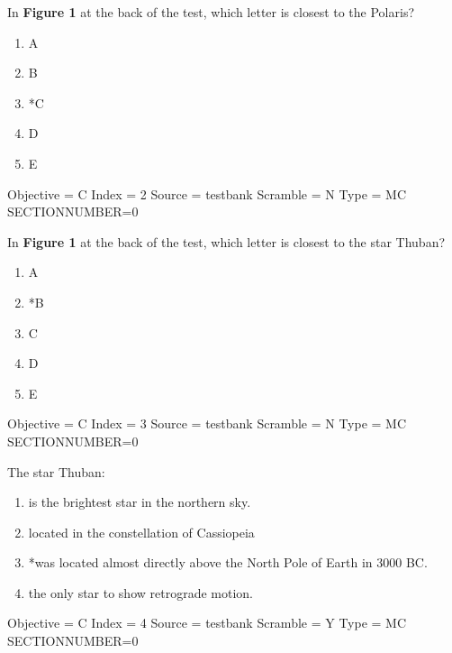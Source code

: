 \documentclass[11pt]{article}
\begin{document}
\begin{enumerate}
\begin{minipage}{\textwidth}
\begin{minipage}{\textwidth}
\item In {\bf Figure 1} at the back of the test, which letter is closest to the Polaris?
\begin{multicols}{3}
\begin{enumerate} 
\setlength{\itemsep}{1pt} 
\setlength{\parskip}{0pt} 
\setlength{\parsep}{0pt}
\setlength{\multicolsep}{1pt} 
\item A
\item B
\item *C
\item D
\item E
\end{enumerate} 
\vfill 
\end{multicols}

Objective = C
Index = 2
Source = testbank
Scramble = N
Type = MC
SECTIONNUMBER=0
\end{minipage}
\end{minipage}
\vskip 0.20in

\begin{minipage}{\textwidth}
\begin{minipage}{\textwidth}
\item In {\bf Figure 1} at the back of the test, which letter is closest to the star Thuban?
\begin{multicols}{3}
\begin{enumerate} 
\setlength{\itemsep}{1pt} 
\setlength{\parskip}{0pt} 
\setlength{\parsep}{0pt}
\setlength{\multicolsep}{1pt} 
\item A
\item *B
\item C
\item D
\item E
\end{enumerate} 
\vfill 
\end{multicols}

Objective = C
Index = 3
Source = testbank
Scramble = N
Type = MC
SECTIONNUMBER=0
\end{minipage}
\end{minipage}
\vskip 0.20in

\begin{minipage}{\textwidth}
\begin{minipage}{\textwidth}
\item The star Thuban:
\begin{enumerate} 
\setlength{\itemsep}{1pt} 
\setlength{\parskip}{0pt} 
\setlength{\parsep}{0pt}
\setlength{\multicolsep}{1pt} 
\item is the brightest star in the northern sky.
\item located in the constellation of Cassiopeia
\item *was located almost directly above the North Pole of Earth in 3000 BC.
\item the only star to show retrograde motion.
\end{enumerate} 
Objective = C
Index = 4
Source = testbank
Scramble = Y
Type = MC
SECTIONNUMBER=0
\end{minipage}
\end{minipage}
\vskip 0.20in


\end{enumerate}
\end{document}
